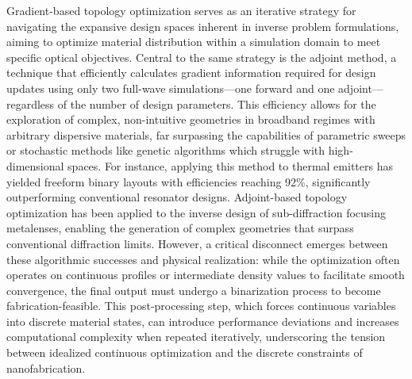 Gradient-based topology optimization serves as an iterative strategy for navigating the expansive design spaces inherent in inverse problem formulations, aiming to optimize material distribution within a simulation domain to meet specific optical objectives. Central to the same strategy is the adjoint method, a technique that efficiently calculates gradient information required for design updates using only two full-wave simulations---one forward and one adjoint---regardless of the number of design parameters. \citep{doi_10_1088_1367_2630_acfcd6_32444f17} This efficiency allows for the exploration of complex, non-intuitive geometries in broadband regimes with arbitrary dispersive materials, far surpassing the capabilities of parametric sweeps or stochastic methods like genetic algorithms which struggle with high-dimensional spaces. For instance, applying this method to thermal emitters has yielded freeform binary layouts with efficiencies reaching 92\%, significantly outperforming conventional resonator designs. Adjoint-based topology optimization has been applied to the inverse design of sub-diffraction focusing metalenses, enabling the generation of complex geometries that surpass conventional diffraction limits. \citep{doi_10_1088_1367_2630_acfcd6_32444f17} However, a critical disconnect emerges between these algorithmic successes and physical realization: while the optimization often operates on continuous profiles or intermediate density values to facilitate smooth convergence, the final output must undergo a binarization process to become fabrication-feasible. This post-processing step, which forces continuous variables into discrete material states, can introduce performance deviations and increases computational complexity when repeated iteratively, underscoring the tension between idealized continuous optimization and the discrete constraints of nanofabrication. \citep{doi_10_48550_arxiv_2603_15210_fdcfb92f} \citep{doi_10_1021_acsphotonics_3c00572_fda8f742} \citep{doi_10_1002_adom_202500249_9967e710}

